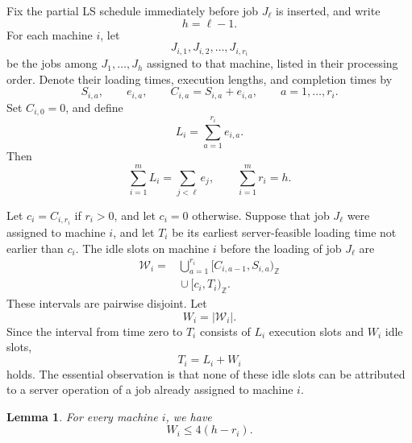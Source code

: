 \documentclass[11pt]{article}
\newtheorem{lemma}[theorem]{Lemma}
\begin{document}
Fix the partial LS schedule immediately before job \(J_\ell\) is inserted, and
write
\[
        h=\ell-1.
\]
For each machine \(i\), let
\[
        J_{i,1},J_{i,2},\ldots,J_{i,r_i}
\]
be the jobs among \(J_1,\ldots,J_h\) assigned to that machine, listed in their
processing order. Denote their loading times, execution lengths, and completion
times by
\[
        S_{i,a},\qquad e_{i,a},\qquad
        C_{i,a}=S_{i,a}+e_{i,a},
        \qquad a=1,\ldots,r_i.
\]
Set \(C_{i,0}=0\), and define
\[
        L_i=\sum_{a=1}^{r_i}e_{i,a}.
\]
Then
\[
        \sum_{i=1}^m L_i=\sum_{j<\ell}e_j,
        \qquad
        \sum_{i=1}^m r_i=h.
\]

Let \(c_i=C_{i,r_i}\) if \(r_i>0\), and let \(c_i=0\) otherwise. Suppose that job
\(J_\ell\) were assigned to machine \(i\), and let \(T_i\) be its earliest
server-feasible loading time not earlier than \(c_i\). The idle slots on machine
\(i\) before the loading of job  \(J_\ell\) are
\[
\begin{aligned}
        \mathcal W_i
        ={}&
        \bigcup_{a=1}^{r_i}
        [C_{i,a-1},S_{i,a})_{\mathbb Z}
        \\
        &{}\cup
        [c_i,T_i)_{\mathbb Z}.
\end{aligned}
\]
These intervals are pairwise disjoint. Let
\[
        W_i=|\mathcal W_i|.
\]
Since the interval from time zero to \(T_i\) consists of \(L_i\) execution slots
and \(W_i\) idle slots,
\[
        T_i=L_i+W_i
\]
holds. The essential observation is that none of these idle slots can be attributed to
a server operation of a job already assigned to machine \(i\).

\begin{lemma}
\label{lem:ls-chain-waiting}
For every machine \(i\), we have
\[
        W_i\le 4(h-r_i).
\]
\end{lemma}
\end{document}
